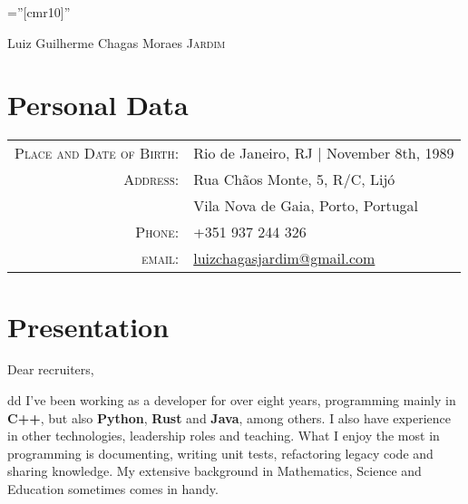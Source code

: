 \documentclass[a4paper,10pt]{article}
\newcommand{\cvtype}{d}
\begin{document}

\pagestyle{empty} %

\font\fb=''[cmr10]'' %

\par{\centering
		{\Huge Luiz Guilherme Chagas Moraes \textsc{Jardim}
	}\bigskip\par}

\section{Personal Data}

\begin{tabular}{rl}
    \textsc{Place and Date of Birth:} & Rio de Janeiro, RJ  | November 8th, 1989 \\
    \textsc{Address:}   & Rua Chãos Monte, 5, R/C, Lijó\\& Vila Nova de Gaia, Porto, Portugal \\
    \textsc{Phone:}     & +351 937 244 326\\
    \textsc{email:}     & \href{mailto:luizchagasjardim@gmail.com}{luizchagasjardim@gmail.com} \\
\end{tabular}

\section{Presentation}
Dear recruiters,

\if \cvtype d
{\quad}I've been working as a developer for over eight years, programming mainly in \textbf{C++}, but also \textbf{Python}, \textbf{Rust} and \textbf{Java}, among others. I also have experience in other technologies, leadership roles and teaching. What I enjoy the most in programming is documenting, writing unit tests, refactoring legacy code and sharing knowledge. My extensive background in Mathematics, Science and Education sometimes comes in handy.
\end{document}
